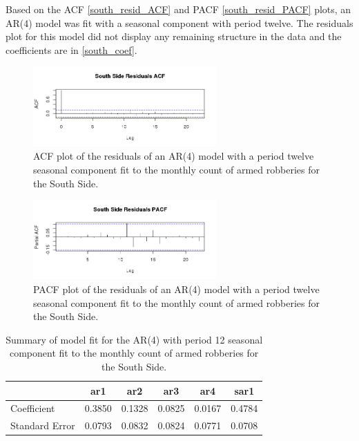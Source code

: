 \documentclass{article} %
\begin{document}
\noindent Based on the ACF \autoref{south_resid_ACF} and PACF \autoref{south_resid_PACF} plots, an AR(4) model was fit with a seasonal component with period twelve. The residuals plot for this model did not display any remaining structure in the data and the coefficients are in \autoref{south_coef}.\newline\newline 

\begin{multicols}{2}
\begin{figure}[H]
\includegraphics[width=70mm]{Plots/south_resid_ACF.png}
\caption{ACF plot of the residuals of an AR(4) model with a period twelve seasonal component fit to the monthly count of armed robberies for the South Side.}
\label{south_resid_ACF}
\end{figure}

\begin{figure}[H]
\includegraphics[width=70mm]{Plots/south_resid_PACF.png}
\caption{PACF plot of the residuals of an AR(4) model with a period twelve seasonal component fit to the monthly count of armed robberies for the South Side.}
\end{figure}
\label{south_resid_PACF}
\end{multicols}


\begin{table}[h]
	\label{tab:data}
	\begin{center}
	\begin{tabular}{lccccc}
			\hline
			  & ar1 &    ar2 &    ar3 &    ar4 &   sar1 \\ \hline
			Coefficient & 0.3850 & 0.1328 & 0.0825  & 0.0167 & 0.4784  \\
			Standard Error &   0.0793 & 0.0832&  0.0824 & 0.0771  &0.0708   \\
		\end{tabular}
	\caption{Summary of model fit for the AR(4) with period 12 seasonal component fit to the monthly count of armed robberies for the South Side.}
	\end{center}
	\label{south_coef}
\end{table}
\end{document}
